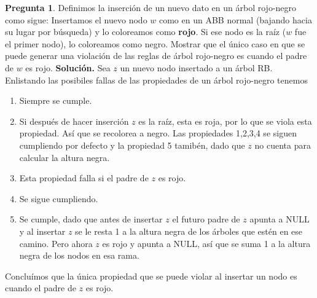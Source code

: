 \documentclass[12pt,letterpaper]{article}
\theoremstyle{definition}
\newtheorem{problm}{Pregunta}
\begin{document}
\begin{problm}
	Definimos la inserción de un nuevo dato en un árbol rojo-negro como sigue: Insertamos el nuevo nodo $ w $ como en un ABB normal (bajando hacia su lugar por búsqueda)  y lo coloreamos como \textbf{rojo}. Si ese nodo es la raíz ($ w $ fue el primer nodo), lo coloreamos como negro. Mostrar que el único caso en que se puede generar una violación de las reglas de árbol rojo-negro es cuando el padre de $ w $ es rojo.
	\textbf{Solución. } Sea $ z $ un nuevo nodo insertado a un árbol RB. Enlistando las posibiles fallas de las propiedades de un árbol rojo-negro tenemos
	\begin{enumerate}
		\item Siempre se cumple.
		\item Si después de hacer inserción $ z $ es la raíz, esta es roja, por lo que se viola esta propiedad. Así que se recolorea a negro. Las propiedades 1,2,3,4 se siguen cumpliendo por defecto y la propiedad 5 tamibén, dado que $ z $ no cuenta para calcular la altura negra.
		\item Esta propiedad falla si el padre de $ z $ es rojo.
		\item Se sigue cumpliendo.
		\item Se cumple, dado que antes de insertar $ z $ el futuro padre de $ z $ apunta a NULL y al insertar $ z $ se le resta 1 a la altura negra de los árboles que estén en ese camino. Pero ahora $ z $ es rojo y apunta a NULL, así que se suma 1 a la altura negra de los nodos en esa rama.
	\end{enumerate}
	Concluímos que la única propiedad que se puede violar al insertar un nodo es cuando el padre de $ z $ es rojo.
\end{problm}
\end{document}
